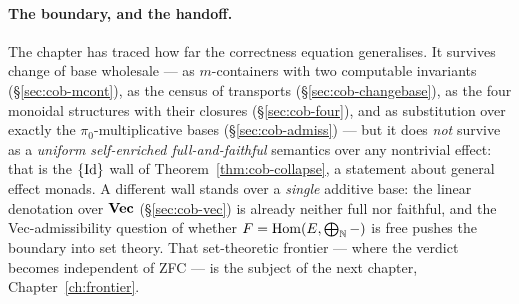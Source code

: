 \paragraph{The boundary, and the handoff.} The chapter has traced how far the
correctness equation generalises. It survives change of base wholesale --- as
$m$-containers with two computable invariants (\S\ref{sec:cob-mcont}), as the
census of transports (\S\ref{sec:cob-changebase}), as the four monoidal
structures with their closures (\S\ref{sec:cob-four}), and as substitution over
exactly the $\pi_0$-multiplicative bases (\S\ref{sec:cob-admiss}) --- but it does
\emph{not} survive as a \emph{uniform self-enriched full-and-faithful} semantics
over any nontrivial effect: that is the $\{\mathrm{Id}\}$ wall of
Theorem~\ref{thm:cob-collapse}, a statement about general effect monads. A
different wall stands over a \emph{single} additive base: the linear denotation
over $\mathbf{Vec}$ (\S\ref{sec:cob-vec}) is already neither full nor faithful, and the
Vec-admissibility question of whether $F=\mathrm{Hom}(E,\bigoplus_{\mathbb{N}}-)$ is free pushes
the boundary into set theory. That set-theoretic frontier --- where the verdict
becomes independent of ZFC --- is the subject of the next chapter,
Chapter~\ref{ch:frontier}.



